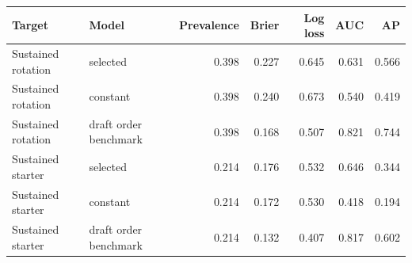 \begin{tabular}{llrrrrr}
\toprule
Target & Model & Prevalence & Brier & Log loss & AUC & AP \\
\midrule
Sustained rotation & selected & 0.398 & 0.227 & 0.645 & 0.631 & 0.566 \\
Sustained rotation & constant & 0.398 & 0.240 & 0.673 & 0.540 & 0.419 \\
Sustained rotation & draft order benchmark & 0.398 & 0.168 & 0.507 & 0.821 & 0.744 \\
Sustained starter & selected & 0.214 & 0.176 & 0.532 & 0.646 & 0.344 \\
Sustained starter & constant & 0.214 & 0.172 & 0.530 & 0.418 & 0.194 \\
Sustained starter & draft order benchmark & 0.214 & 0.132 & 0.407 & 0.817 & 0.602 \\
\bottomrule
\end{tabular}